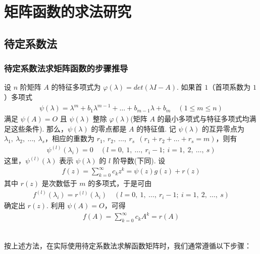 \section{矩阵函数的求法研究}
\fontsize{12pt}{14pt}\selectfont
\songti
    \subsection{待定系数法}
        \subsubsection{待定系数法求矩阵函数的步骤推导}
            \par 设 $n$ 阶矩阵 $A$ 的特征多项式为 $\varphi(\lambda) = det(\lambda I - A)$. 如果首 $1$（首项系数为 $1$）多项式
            \begin{align*}
                \psi(\lambda) = \lambda^m + b_1\lambda^{m-1} + \dots + b_{m-1}\lambda + b_m \quad (1 \leq m \leq n)
            \end{align*}
            满足 $\psi(A) = O$ 且 $\psi(\lambda)$ 整除 $\varphi(\lambda)$(矩阵 $A$ 的最小多项式与特征多项式均满足这些条件). 那么，$\psi(\lambda)$ 的零点都是 $A$ 的特征值. 记 $\psi(\lambda)$ 的互异零点为 $\lambda_1, \ \lambda_2, \ \dots, \ \lambda_s$，相应的重数为 $r_1, \ r_2, \ \dots, \ r_s \ \ (r_1 + r_2 + \dots + r_s = m)$，则有
            \begin{align*}
                \psi^{(l)}(\lambda_i) = 0 \quad (l = 0, \ 1, \ \dots, \ r_i - 1; \ i = 1, \ 2, \ \dots, \ s)
            \end{align*}
            这里，$\psi^{(l)}(\lambda)$ 表示 $\psi(\lambda)$ 的 $l$ 阶导数(下同). 设
            \begin{align*}
                f(z) = \sum_{k=0}^{\infty}c_kz^k = \psi(z)g(z) + r(z)
            \end{align*}
            其中 $r(z)$ 是次数低于 $m$ 的多项式，于是可由 
            \begin{align*}
                f^{(l)}(\lambda_i) = r^{(l)}(\lambda_i) \quad (l = 0, \ 1, \ \dots, \ r_i - 1; \ i = 1, \ 2, \ \dots, \ s)
            \end{align*}
            确定出 $r(z)$. 利用 $\psi(A) = O$，可得
            \begin{align*}
                f(A) = \sum_{k=0}^{\infty}c_kA^k = r(A) 
            \end{align*}
            \\
            \par 按上述方法，在实际使用待定系数法求解函数矩阵时，我们通常遵循以下步骤：

